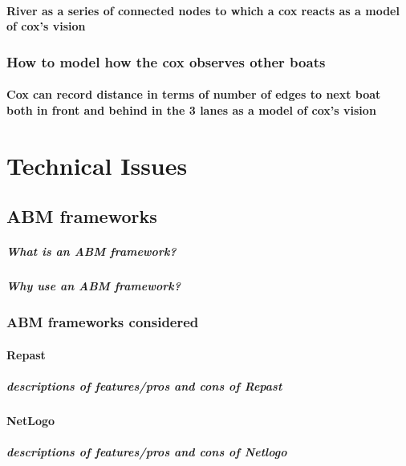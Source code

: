       \subsubsection{River as a series of connected nodes to which a cox reacts as a model of cox's vision}
    \subsection{How to model how the cox observes other boats}
      \subsubsection{Cox can record distance in terms of number of edges to next boat both in front and behind in the 3 lanes as a model of cox's vision}
          
\chapter{Technical Issues}
  \section{ABM frameworks}
    \paragraph{What is an ABM framework?}
    \paragraph{Why use an ABM framework?}
    
    \subsection{ABM frameworks considered}
      \subsubsection{Repast}
        \paragraph{descriptions of features/pros and cons of Repast}
      \subsubsection{NetLogo}
        \paragraph{descriptions of features/pros and cons of Netlogo}
        
